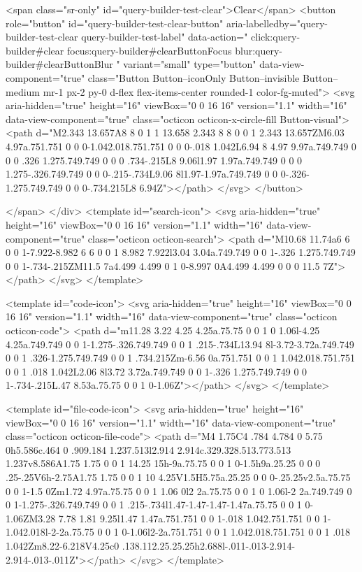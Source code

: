 {{            <span class="sr-only" id="query-builder-test-clear">Clear</span>
            <button role="button" id="query-builder-test-clear-button" aria-labelledby="query-builder-test-clear query-builder-test-label" data-action="
                  click:query-builder#clear
                  focus:query-builder#clearButtonFocus
                  blur:query-builder#clearButtonBlur
                " variant="small" type="button" data-view-component="true" class="Button Button--iconOnly Button--invisible Button--medium mr-1 px-2 py-0 d-flex flex-items-center rounded-1 color-fg-muted">  <svg aria-hidden="true" height="16" viewBox="0 0 16 16" version="1.1" width="16" data-view-component="true" class="octicon octicon-x-circle-fill Button-visual">
    <path d="M2.343 13.657A8 8 0 1 1 13.658 2.343 8 8 0 0 1 2.343 13.657ZM6.03 4.97a.751.751 0 0 0-1.042.018.751.751 0 0 0-.018 1.042L6.94 8 4.97 9.97a.749.749 0 0 0 .326 1.275.749.749 0 0 0 .734-.215L8 9.06l1.97 1.97a.749.749 0 0 0 1.275-.326.749.749 0 0 0-.215-.734L9.06 8l1.97-1.97a.749.749 0 0 0-.326-1.275.749.749 0 0 0-.734.215L8 6.94Z"></path>
</svg>
</button>

          </span>
      </div>
      <template id="search-icon">
  <svg aria-hidden="true" height="16" viewBox="0 0 16 16" version="1.1" width="16" data-view-component="true" class="octicon octicon-search">
    <path d="M10.68 11.74a6 6 0 0 1-7.922-8.982 6 6 0 0 1 8.982 7.922l3.04 3.04a.749.749 0 0 1-.326 1.275.749.749 0 0 1-.734-.215ZM11.5 7a4.499 4.499 0 1 0-8.997 0A4.499 4.499 0 0 0 11.5 7Z"></path>
</svg>
</template>

<template id="code-icon">
  <svg aria-hidden="true" height="16" viewBox="0 0 16 16" version="1.1" width="16" data-view-component="true" class="octicon octicon-code">
    <path d="m11.28 3.22 4.25 4.25a.75.75 0 0 1 0 1.06l-4.25 4.25a.749.749 0 0 1-1.275-.326.749.749 0 0 1 .215-.734L13.94 8l-3.72-3.72a.749.749 0 0 1 .326-1.275.749.749 0 0 1 .734.215Zm-6.56 0a.751.751 0 0 1 1.042.018.751.751 0 0 1 .018 1.042L2.06 8l3.72 3.72a.749.749 0 0 1-.326 1.275.749.749 0 0 1-.734-.215L.47 8.53a.75.75 0 0 1 0-1.06Z"></path>
</svg>
</template>

<template id="file-code-icon">
  <svg aria-hidden="true" height="16" viewBox="0 0 16 16" version="1.1" width="16" data-view-component="true" class="octicon octicon-file-code">
    <path d="M4 1.75C4 .784 4.784 0 5.75 0h5.586c.464 0 .909.184 1.237.513l2.914 2.914c.329.328.513.773.513 1.237v8.586A1.75 1.75 0 0 1 14.25 15h-9a.75.75 0 0 1 0-1.5h9a.25.25 0 0 0 .25-.25V6h-2.75A1.75 1.75 0 0 1 10 4.25V1.5H5.75a.25.25 0 0 0-.25.25v2.5a.75.75 0 0 1-1.5 0Zm1.72 4.97a.75.75 0 0 1 1.06 0l2 2a.75.75 0 0 1 0 1.06l-2 2a.749.749 0 0 1-1.275-.326.749.749 0 0 1 .215-.734l1.47-1.47-1.47-1.47a.75.75 0 0 1 0-1.06ZM3.28 7.78 1.81 9.25l1.47 1.47a.751.751 0 0 1-.018 1.042.751.751 0 0 1-1.042.018l-2-2a.75.75 0 0 1 0-1.06l2-2a.751.751 0 0 1 1.042.018.751.751 0 0 1 .018 1.042Zm8.22-6.218V4.25c0 .138.112.25.25.25h2.688l-.011-.013-2.914-2.914-.013-.011Z"></path>
</svg>
</template>

}}
